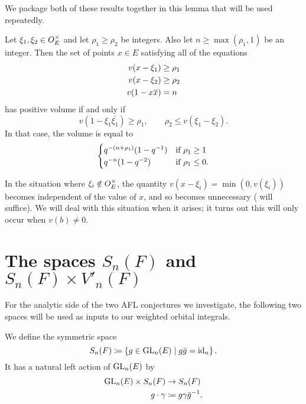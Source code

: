 We package both of these results together in this lemma that will be used repeatedly.
\begin{lemma}
  \label{lem:quadruple_ineq}
  Let $\xi_1, \xi_2 \in O_E^\times$ and let $\rho_1 \ge \rho_2$ be integers.
  Also let $n \ge \max(\rho_1, 1)$ be an integer.
  Then the set of points $x \in E$ satisfying all of the equations
  \begin{align*}
    v(x - \xi_1) &\ge \rho_1 \\
    v(x - \xi_2) &\ge \rho_2 \\
    v(1 - x \overline x) &= n
  \end{align*}
  has positive volume if and only if
  \[ v(1 - \xi_1 \bar{\xi_1}) \ge \rho_1, \qquad \rho_2 \le v(\xi_1 - \xi_2). \]
  In that case, the volume is equal to
  \[
    \begin{cases}
      q^{-(n+\rho_1)}(1-q^{-1}) & \text{if } \rho_1 \ge 1 \\
      q^{-n}(1-q^{-2}) & \text{if } \rho_1 \le 0.
    \end{cases}
  \]
\end{lemma}
In the situation where $\xi_i \notin O_E^\times$,
the quantity $v(x-\xi_i) = \min(0, v(\xi_i))$
becomes independent of the value of $x$,
and so  becomes unnecessary
( will suffice).
We will deal with this situation when it arises;
it turns out this will only occur when $v(b) \neq 0$.

\section{The spaces $S_n(F)$ and $S_n(F) \times V'_n(F)$}
For the analytic side of the two AFL conjectures we investigate,
the following two spaces will be used as inputs to our weighted orbital integrals.
\begin{definition}
  We define the symmetric space
  \[ S_n(F) \coloneqq \left\{ g \in \operatorname{GL}_n(E) \mid g \bar g = \operatorname{id}_n \right\}. \]
  It has a natural left action of $\operatorname{GL}_n(E)$ by
  \begin{align*}
    \operatorname{GL}_n(E) \times S_n(F) &\to S_n(F) \\
    g \cdot \gamma &\coloneqq g \gamma \bar g^{-1}.
  \end{align*}
\end{definition}

